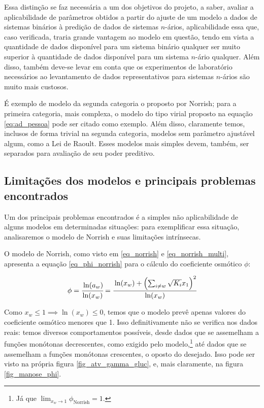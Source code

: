 \documentclass[
	12pt,				%
	openright,
	twoside,
	a4paper,			%
	english,			%
	french,				%
	spanish,			%
	brazil				%
	]{abntex2}
\begin{document}
Essa distinção se faz necessária a um dos objetivos do projeto, a saber, avaliar
a aplicabilidade de parâmetros obtidos a partir do ajuste de um modelo a dados
de sistemas binários à predição de dados de sistemas $n$-ários, aplicabilidade
essa que, caso verificada, traria grande vantagem ao modelo em questão, tendo em
vista a quantidade de dados disponível para um sistema binário qualquer
ser muito superior à quantidade de dados disponível para um sistema $n$-ário
qualquer. Além disso, também deve-se levar em conta que os experimentos de
laboratório necessários ao levantamento de dados representativos para sistemas
$n$-ários são muito mais custosos.

É exemplo de modelo da segunda categoria o proposto por Norrish; para a
primeira categoria, mais complexa, o modelo do tipo virial proposto na equação
\ref{eq:ad_pessoa} pode ser citado como exemplo. Além disso, claramente temos,
inclusos de forma trivial na segunda categoria, modelos sem parâmetro ajustável
algum, como a Lei de Raoult. Esses modelos mais simples devem, também, ser
separados para avaliação de seu poder preditivo.

\subsection{Limitações dos modelos e principais problemas encontrados}

Um dos principais problemas encontrados é a simples não aplicabilidade de
alguns modelos em determinadas situações: para exemplificar essa situação,
analisaremos o modelo de Norrish e suas limitações intrínsecas.

O modelo de Norrish, como visto em \ref{eq_norrish} e \ref{eq_norrish_multi},
apresenta a equação \ref{eq_phi_norrish} para o cálculo do coeficiente
osmótico $\phi$:

\begin{equation}
	\label{eq_phi_norrish}
	\phi = \cfrac{\ln(a_w)}{\ln(x_w)} = \cfrac{\ln(x_w) + \left(\sum_{ i\neq w}
	\sqrt{K_i}x_1\right)^2}{\ln(x_w)}
\end{equation}

Como $x_w \le 1 \implies \ln(x_w) \le 0$, temos que o modelo prevê apenas
valores do coeficiente osmótico menores que 1. Isso definitivamente não se
verifica nos dados reais: temos diversos comportamentos possíveis, desde
dados que se assemelham a funções monótonas decrescentes, como exigido pelo
modelo,\footnote{%
	Já que $\lim_{x_w \to 1}\phi_\text{Norrish} = 1$.
} até dados que se assemelham a funções monótonas crescentes, o oposto do
desejado. Isso pode ser visto na própria figura \ref{fig_atv_gamma_gluc}, e,
mais claramente, na figura \ref{fig_manose_phi}.
\end{document}
